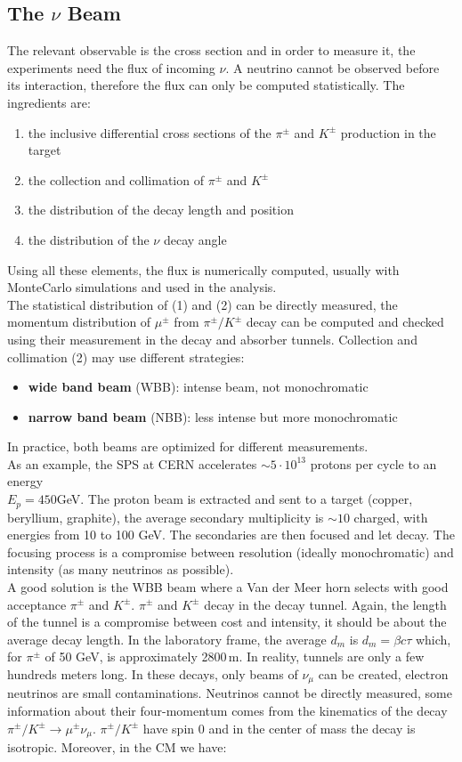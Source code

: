 \documentclass[10.75pt,a4paper,openright,bottom=2cm]{article}
\begin{document}
\subsection{The $\nu$ Beam}
The relevant observable is the cross section and in order to measure it, the experiments need the flux of incoming $\nu$. A neutrino cannot be observed before its interaction, therefore the flux can only be computed statistically. The ingredients are:
\begin{enumerate}
    \item the inclusive differential cross sections of the $\pi^\pm$ and $K^\pm$ production in the target
    \item the collection and collimation of $\pi^\pm$ and $K^\pm$
    \item the distribution of the decay length and position
    \item the distribution of the $\nu$ decay angle
\end{enumerate}
Using all these elements, the flux is numerically computed, usually with MonteCarlo simulations and used in the analysis.\\
The statistical distribution of (1) and (2) can be directly measured, the momentum distribution of $\mu^\pm$ from $\pi^\pm/K^\pm$ decay can be computed and checked using their measurement in the decay and absorber tunnels. Collection and collimation (2) may use different strategies:
\begin{itemize}
    \item \textbf{wide band beam} (WBB): intense beam, not monochromatic
    \item \textbf{narrow band beam} (NBB): less intense but more monochromatic
\end{itemize}
In practice, both beams are optimized for different measurements.\\
As an example, the SPS at CERN accelerates $\sim5\cdot10^{13}$ protons per cycle to an energy\\
$E_p=450$\;GeV. The proton beam is extracted and sent to a target (copper, beryllium, graphite), the average secondary multiplicity is $\sim10$ charged, with energies from 10 to 100 GeV. The secondaries are then focused and let decay. The focusing process is a compromise between resolution (ideally monochromatic) and intensity (as many neutrinos as possible).\\
A good solution is the WBB beam where a Van der Meer horn selects with good acceptance $\pi^\pm$ and $K^\pm$. $\pi^\pm$ and $K^\pm$ decay in the decay tunnel. Again, the length of the tunnel is a compromise between cost and intensity, it should be about the average decay length. In the laboratory frame, the average $d_m$ is $d_m=\beta c\tau$ which, for $\pi^\pm$ of 50 GeV, is approximately 2800\,m. In reality, tunnels are only a few hundreds meters long. In these decays, only beams of $\nu_\mu$ can be created, electron neutrinos are small contaminations. Neutrinos cannot be directly measured, some information about their four-momentum comes from the kinematics of the decay $\pi^\pm/K^\pm\to\mu^\pm\nu_\mu$. $\pi^\pm/K^\pm$ have spin 0 and in the center of mass the decay is isotropic. Moreover, in the CM we have:
\end{document}
